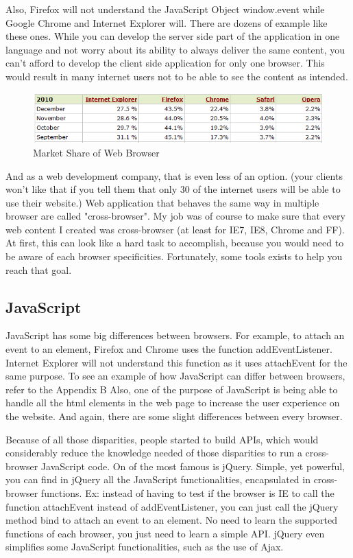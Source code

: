 Also, Firefox will not understand the JavaScript Object window.event while Google Chrome and Internet Explorer will. There are dozens of example like these ones.
While you can develop the server side part of the application in one language and not worry about its ability to always deliver the same content, you can't afford to develop the client side application for only one browser. This would result in many internet users not to be able to see the content as intended.

\begin{figure}[!ht]
\centering
\includegraphics[width=.55\textwidth]{img/browser_statistics.png}
\caption{Market Share of Web Browser}
\label{figure:market-brosers}
\end{figure}

And as a web development company, that is even less of an option. (your clients won't like that if you tell them that only 30 of the internet users will be able to use their website.)
Web application that behaves the same way in multiple browser are called "cross-browser". 
My job was of course to make sure that every web content I created was cross-browser (at least for IE7, IE8, Chrome and FF).
At first, this can look like a hard task to accomplish, because you would need to be aware of each browser specificities. Fortunately, some tools exists to help you reach that goal.

\subsection{JavaScript}

JavaScript has some big differences between browsers. For example, to attach an event to an element, Firefox and Chrome uses the function addEventListener. Internet Explorer will not understand this function as it uses attachEvent for the same purpose. To see an example of how JavaScript can differ between browsers, refer to the Appendix B
Also, one of the purpose of JavaScript is being able to handle all the html elements in the web page to increase the user experience on the website. And again, there are some slight differences between every browser.

Because of all those disparities, people started to build APIs, which would considerably reduce the knowledge needed of those disparities to run a cross-browser JavaScript code. On of the most famous is jQuery. Simple, yet powerful, you can find in jQuery all the JavaScript functionalities, encapsulated in cross-browser functions. Ex: instead of having to test if the browser is IE to call the function attachEvent instead of addEventListener, you can just call the jQuery method bind to attach an event to an element. No need to learn the supported functions of each browser, you just need to learn a simple API. jQuery even simplifies some JavaScript functionalities, such as the use of Ajax.

